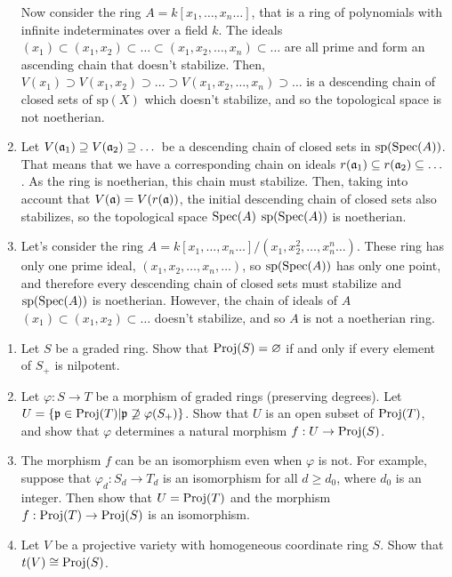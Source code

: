 \begin{sol}
\begin{enumerate}[label=\alph*)]
		Now consider the ring $A = k[x_1, \dots, x_n \dots]$, that is a ring of polynomials with infinite indeterminates over a field $k$. The ideals $(x_1) \subset (x_1, x_2) \subset \dots \subset (x_1, x_2, \dots, x_n) \subset \dots$ are all prime and form an ascending chain that doesn't stabilize. Then, $V(x_1) \supset V(x_1, x_2) \supset \dots \supset V(x_1, x_2, \dots, x_n) \supset \dots$ is a descending chain of closed sets of $\text{sp}(X)$ which doesn't stabilize, and so the topological space is not noetherian.

		\item Let $V(\mathfrak{a}_1) \supseteq V(\mathfrak{a}_2) \supseteq \dots$ be a descending chain of closed sets in $\mathrm{sp}(\mathrm{Spec}(A))$. That means that we have a corresponding chain on ideals $r(\mathfrak{a}_1) \subseteq r(\mathfrak{a}_2) \subseteq \dots$. As the ring is noetherian, this chain must stabilize. Then, taking into account that $V(\mathfrak{a}) = V(r(\mathfrak{a}))$, the initial descending chain of closed sets also stabilizes, so the topological space $\mathrm{Spec}(A)$ $\mathrm{sp}(\mathrm{Spec}(A))$ is noetherian.

		\item Let's consider the ring $A = k[x_1, \dots, x_n \dots] / (x_1, x_2^2, \dots, x_n^n \dots)$. These ring has only one prime ideal, $(x_1, x_2, \dots, x_n, \dots)$, so $\mathrm{sp}(\mathrm{Spec}(A))$ has only one point, and therefore every descending chain of closed sets must stabilize and $\mathrm{sp}(\mathrm{Spec}(A))$ is noetherian. However, the chain of ideals of $A$ $(x_1) \subset (x_1, x_2) \subset \dots$ doesn't stabilize, and so $A$ is not a noetherian ring.
	\end{enumerate}

\end{sol}

\begin{ex}
	\begin{enumerate}[label=\alph*)]
		\item Let $S$ be a graded ring. Show that $\mathrm{Proj}(S) = \varnothing$ if and only if every element of $S_{+}$ is nilpotent.
		\item Let $\varphi: S \to T$ be a morphism of graded rings (preserving degrees). Let $U = \{\mathfrak{p} \in \mathrm{Proj}(T) | \mathfrak{p} \not\supseteq \varphi(S_+)\}$. Show that $U$ is an open subset of $\mathrm{Proj}(T)$, and show that $\varphi$ determines a natural morphism $f: U \to \mathrm{Proj}(S)$.
		\item The morphism $f$ can be an isomorphism even when $\varphi$ is not. For example, suppose that $\varphi_d: S_d \to T_d$ is an isomorphism for all $d \geq d_0$, where $d_0$ is an integer. Then show that $U = \mathrm{Proj}(T)$ and the morphism $f: \mathrm{Proj}(T) \to \mathrm{Proj}(S)$ is an isomorphism.
		\item Let $V$ be a projective variety with homogeneous coordinate ring $S$. Show that $t(V) \cong \mathrm{Proj}(S)$. 
	\end{enumerate}
\end{ex}

